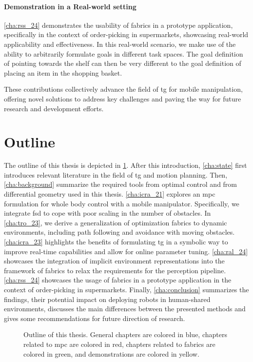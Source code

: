 \paragraph{Demonstration in a Real-world setting}
\cref{cha:rss_24} demonstrates the usability of \ac{fabrics}
in a prototype application, specifically in the
context of order-picking in supermarkets, showcasing
real-world applicability and effectiveness. In this
real-world scenario, we make use of the ability
to arbitrarily formulate goals in different task
spaces. The goal definition of pointing towards the
shelf can then be very different to the goal
definition of placing an item in the shopping basket.

These contributions collectively advance the field of
\ac{tg} for mobile manipulation, offering novel
solutions to address key challenges and paving the way for
future research and development efforts.

\section{Outline}

The outline of this thesis is depicted in \cref{fig:outline}.
After this introduction, \cref{cha:state} first introduces
relevant literature in the field of \ac{tg}
and motion planning.
Then, \cref{cha:background} summarize the required tools
from optimal control and from differential geometry used in this thesis.
\cref{cha:icra_21} explores an \ac{mpc}
formulation for whole body control
with a mobile manipulator. Specifically, we integrate
\acl{fsd} to cope with poor scaling in the number of
obstacles.
In \cref{cha:tro_23}, we derive a
generalization of optimization fabrics to dynamic
environments, including path following and avoidance with
moving obstacles.
\cref{cha:icra_23} highlights the benefits of
formulating \ac{tg} in a symbolic way to
improve real-time capabilities and allow for online
parameter tuning.
\cref{cha:ral_24} showcases the integration of
implicit environment representations into the framework of
\ac{fabrics} to relax the requirements for the
perception pipeline.
\cref{cha:rss_24} showcases the 
usage of \ac{fabrics} in a prototype application in the
context of order-picking in supermarkets.
Finally,
\cref{cha:conclusion} summarizes the findings, their potential impact
on deploying robots in human-shared environments, discusses
the main differences between the presented methods and gives some
recommendations for future direction of research.
%
\begin{figure}[ht]
  \begin{center}
    
  \end{center}
  \caption{Outline of this thesis. General chapters are
  colored in blue, chapters related to \ac{mpc} are colored
  in red, chapters related to \ac{fabrics} are colored in 
  green, and demonstrations are colored in yellow.}
  \label{fig:outline}
\end{figure}
%


